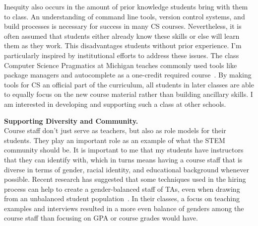 \documentclass[11pt]{article} %
\begin{document}

Inequity also occurs in the amount of prior knowledge students bring with them
to class.
%
An understanding of command line tools, version control systems, and build
processes is necessary for success in many CS courses. Nevertheless, it is
often assumed that students either already know these skills or else will learn
them as they work. This disadvantages students without prior experience.
%
%
I'm particularly inspired by institutional efforts to address these issues. The
class Computer Science Pragmatics at Michigan teaches commonly used tools like
package managers and autocomplete as a one-credit required
course~\footnotemark{}.
%
By making tools for CS an official part of the curriculum, all students in
later classes are able to equally focus on the new course material rather than
building ancillary skills.
%
I am interested in developing and supporting such a class at other schools.


\medskip
\textbf{\textsf{\large Supporting Diversity and Community.}}\\
Course staff don't just serve as teachers, but also as role models for their
students. They play an important role as an example of what the STEM community
should be.
%
It is important to me that my students have instructors that they can identify
with, which in turns means having a course staff that is diverse in terms of
gender, racial identity, and educational background whenever possible.
%
Recent research has suggested that some techniques used in the hiring process
can help to create a gender-balanced staff of TAs, even when drawing from an
unbalanced student population~\footnotemark{}. In their classes, a focus on
teaching examples and interviews resulted in a more even balance of genders
among the course staff than focusing on GPA or course grades would have.
\end{document}
